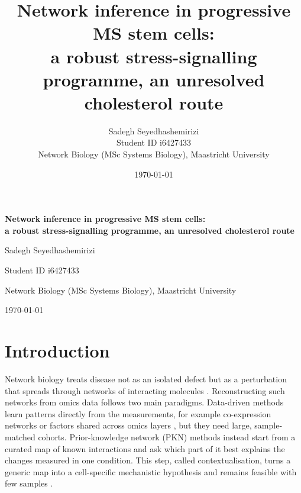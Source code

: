 \documentclass[11pt, a4paper]{article}
\title{\textbf{Network inference in progressive MS stem cells:\\
a robust stress-signalling programme, an unresolved cholesterol route}}
\author{Sadegh Seyedhashemirizi\\Student ID i6427433\\[1ex]
\small Network Biology (MSc Systems Biology), Maastricht University}
\date{\today}
\begin{document}
\begin{titlepage}
\centering
\vspace*{\fill}
{\Large\bfseries Network inference in progressive MS stem cells:\\
a robust stress-signalling programme, an unresolved cholesterol route\par}
\vspace{2.5em}
{\large Sadegh Seyedhashemirizi\par}
Student ID i6427433\par
\vspace{1em}
Network Biology (MSc Systems Biology), Maastricht University\par
\vspace{1em}
\today\par
\vspace*{\fill}
\end{titlepage}

\section{Introduction}

Network biology treats disease not as an isolated defect but as a perturbation that spreads
through networks of interacting molecules \cite{barabasi2011network}. Reconstructing such networks
from omics data follows two main paradigms. Data-driven methods learn patterns directly from the
measurements, for example co-expression networks \cite{huynhthu2010genie3} or factors shared across
omics layers \cite{argelaguet2020mofa,capraz2026sofa}, but they need large, sample-matched cohorts.
Prior-knowledge network (PKN) methods instead start from a curated map of known interactions and
ask which part of it best explains the changes measured in one condition. This step, called
contextualisation, turns a generic map into a cell-specific mechanistic hypothesis and remains
feasible with few samples \cite{garridorodriguez2022}.
\end{document}
